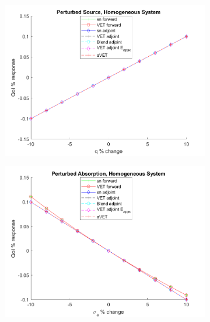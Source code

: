 \documentclass[12pt]{report}
\begin{document}
\begin{figure}[H]
\centering
\begin{subfigure}{.5\textwidth}
  \centering
  \includegraphics[width=.98\linewidth]{figures2/22qSens.png}
\end{subfigure}%
\begin{subfigure}{.5\textwidth}
  \centering
  \includegraphics[width=.98\linewidth]{figures2/22sigaSens.png}
\end{subfigure}
%
\begin{subfigure}{.5\textwidth}
  \centering

\end{subfigure}
\end{figure}
\end{document}
